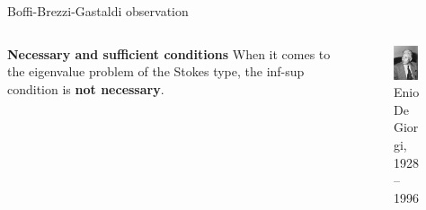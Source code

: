 \documentclass{beamer}
\begin{document}
	\begin{frame}{Boffi-Brezzi-Gastaldi observation}
		\begin{columns}[T] 
			\begin{column}{0.65\textwidth} 
			
			\vspace{0.2cm} 
			\begin{alertblock}{\textbf{Necessary and sufficient conditions}}
				When it comes to the eigenvalue problem of the Stokes type, the inf-sup condition is \textbf{not necessary}.
			\end{alertblock}
			\end{column} 
			
			\begin{column}{0.35\textwidth} 
				\begin{figure} 
					\centering 
					\includegraphics[width=0.8\textwidth]{Figures/DeGiorgi.jpg} 
					\caption*{\tiny{Enio De Giorgi, 1928--1996}} 
				\end{figure} 
			\end{column} 
		\end{columns} 
	\end{frame}
\end{document}
